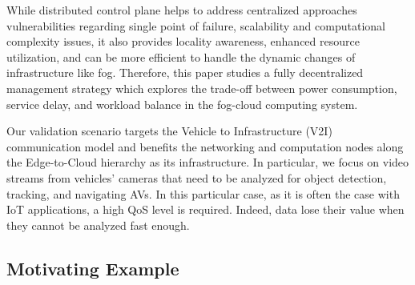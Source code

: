 \documentclass[twocolumn]{article}
\begin{document}
\par While distributed control plane helps to address centralized approaches vulnerabilities regarding single point of failure, scalability and computational complexity issues, it also provides locality awareness, enhanced resource utilization, and can be more efficient to handle the dynamic changes of infrastructure like fog\cite{salaht2020overview,nezami2021decentralized}. Therefore, this paper studies a fully decentralized management strategy which explores the trade-off between power consumption, service delay, and workload balance in the fog-cloud computing system.

\par Our validation scenario targets the Vehicle to Infrastructure (V2I) communication model and benefits the networking and computation nodes along the Edge-to-Cloud hierarchy as its infrastructure. In particular, we focus on video streams from
vehicles' cameras that need to be analyzed for object detection, tracking, and navigating AVs. In this particular case, as it is often the case with IoT applications, a high QoS level is required. Indeed, data lose their
value when they cannot be analyzed fast enough.

\subsection{Motivating Example}
\end{document}

